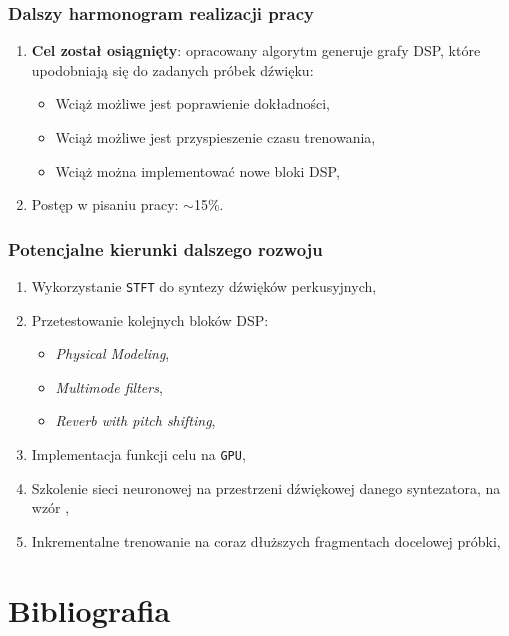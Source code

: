 \documentclass[]{beamer}
\begin{document}
\begin{frame}
  \frametitle{Dalszy harmonogram realizacji pracy}

  \begin{enumerate}
    \item \textbf{Cel został osiągnięty}: opracowany algorytm generuje grafy DSP, które upodobniają się do zadanych próbek dźwięku:
      \begin{itemize}
        \item Wciąż możliwe jest poprawienie dokładności,
        \item Wciąż możliwe jest przyspieszenie czasu trenowania,
        \item Wciąż można implementować nowe bloki DSP,
      \end{itemize}
    \item Postęp w pisaniu pracy: $\sim$15\%.
  \end{enumerate}
\end{frame}

\begin{frame}
  \frametitle{Potencjalne kierunki dalszego rozwoju}

  \begin{enumerate}
    \item Wykorzystanie \texttt{STFT}\cite{sliding_fourier} do syntezy dźwięków perkusyjnych,
    \item Przetestowanie kolejnych bloków DSP:
      \begin{itemize}
        \item \textit{Physical Modeling},
        \item \textit{Multimode filters},
        \item \textit{Reverb with pitch shifting},
      \end{itemize}
    \item Implementacja funkcji celu na \texttt{GPU},
    \item Szkolenie sieci neuronowej na przestrzeni dźwiękowej danego syntezatora, na wzór \cite{multi_task_synth_programming},
    \item Inkrementalne trenowanie na coraz dłuższych fragmentach docelowej próbki,
  \end{enumerate}
\end{frame}



\section{Bibliografia}
\end{document}
